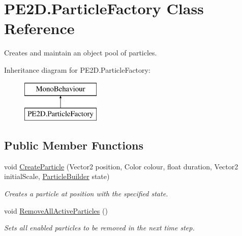 \hypertarget{class_p_e2_d_1_1_particle_factory}{}\section{P\+E2\+D.\+Particle\+Factory Class Reference}
\label{class_p_e2_d_1_1_particle_factory}


Creates and maintain an object pool of particles.  


Inheritance diagram for P\+E2\+D.\+Particle\+Factory\+:\begin{figure}[H]
\begin{center}
\leavevmode
\includegraphics[height=2.000000cm]{class_p_e2_d_1_1_particle_factory}
\end{center}
\end{figure}
\subsection*{Public Member Functions}
\begin{DoxyCompactItemize}
\item 
void \hyperlink{class_p_e2_d_1_1_particle_factory_a5d0fd6f0ecf11f2545ff889e02eaf09a}{Create\+Particle} (Vector2 position, Color colour, float duration, Vector2 initial\+Scale, \hyperlink{struct_p_e2_d_1_1_particle_builder}{Particle\+Builder} state)
\begin{DoxyCompactList}\small\item\em Creates a particle at position with the specified state. \end{DoxyCompactList}\item 
void \hyperlink{class_p_e2_d_1_1_particle_factory_a6d8498b66145f0035b9346118aad9150}{Remove\+All\+Active\+Particles} ()
\begin{DoxyCompactList}\small\item\em Sets all enabled particles to be removed in the next time step. \end{DoxyCompactList}\end{DoxyCompactItemize}
